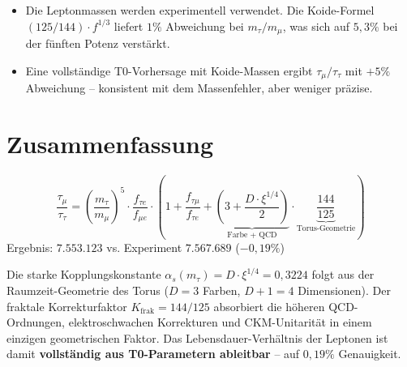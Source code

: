 	\begin{itemize}
		\item Die Leptonmassen werden experimentell verwendet. Die Koide-Formel $(125/144) \cdot f^{1/3}$ liefert $1\%$ Abweichung bei $m_\tau/m_\mu$, was sich auf $5{,}3\%$ bei der fünften Potenz verstärkt.
		\item Eine vollständige T0-Vorhersage mit Koide-Massen ergibt $\tau_\mu/\tau_\tau$ mit $+5\%$ Abweichung -- konsistent mit dem Massenfehler, aber weniger präzise.
	\end{itemize}
	
	
	\section{Zusammenfassung}
	
	\begin{keypoint}
		\begin{equation}
			\frac{\tau_\mu}{\tau_\tau} = \left(\frac{m_\tau}{m_\mu}\right)^5 \cdot \frac{f_{\tau e}}{f_{\mu e}} \cdot \left(1 + \frac{f_{\tau\mu}}{f_{\tau e}} + \underbrace{\left(3 + \frac{D \cdot \xi^{1/4}}{2}\right)}_{\text{Farbe + QCD}} \cdot \underbrace{\frac{144}{125}}_{\text{Torus-Geometrie}}\right)
		\end{equation}
		Ergebnis: $7{.}553{.}123$ vs. Experiment $7{.}567{.}689$ (\textbf{$-0{,}19\%$})
	\end{keypoint}
	
	Die starke Kopplungskonstante $\alpha_s(m_\tau) = D \cdot \xi^{1/4} = 0{,}3224$ folgt aus der Raumzeit-Geometrie des Torus ($D = 3$ Farben, $D+1 = 4$ Dimensionen). Der fraktale Korrekturfaktor $K_\text{frak} = 144/125$ absorbiert die höheren QCD-Ordnungen, elektroschwachen Korrekturen und CKM-Unitarität in einem einzigen geometrischen Faktor. Das Lebensdauer-Verhältnis der Leptonen ist damit \textbf{vollständig aus T0-Parametern ableitbar} -- auf $0{,}19\%$ Genauigkeit.
